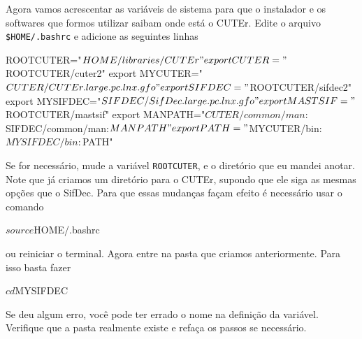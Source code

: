 \documentclass[letterpaper,11pt]{article}
\numberwithin{equation}{section}
\begin{document}
Agora vamos acrescentar as variáveis de sistema para que o instalador e os softwares
que formos utilizar saibam onde está o CUTEr. Edite o arquivo \verb+$HOME/.bashrc+ e
adicione as seguintes linhas
\begin{terminal}
ROOTCUTER="$HOME/libraries/CUTEr"
export CUTER="$ROOTCUTER/cuter2"
export MYCUTER="$CUTER/CUTEr.large.pc.lnx.gfo" 
export SIFDEC="$ROOTCUTER/sifdec2"
export MYSIFDEC="$SIFDEC/SifDec.large.pc.lnx.gfo" 
export MASTSIF="$ROOTCUTER/mastsif" 
export MANPATH="$CUTER/common/man:$SIFDEC/common/man:$MANPATH" 
export PATH="$MYCUTER/bin:$MYSIFDEC/bin:$PATH"
\end{terminal}
Se for necessário, mude a variável \verb+ROOTCUTER+, e o diretório que eu mandei anotar. 
Note que já criamos um diretório para o CUTEr, supondo que ele siga as mesmas opções
que o SifDec. 
Para que essas mudanças façam efeito é necessário usar o comando
\begin{terminal}
$ source $HOME/.bashrc
\end{terminal}
ou reiniciar o terminal.
Agora entre na pasta que criamos anteriormente. Para isso basta fazer
\begin{terminal}
$ cd $MYSIFDEC
\end{terminal}
Se deu algum erro, você pode ter errado o nome na definição da variável. Verifique que a
pasta realmente existe e refaça os passos se necessário.
\end{document}
